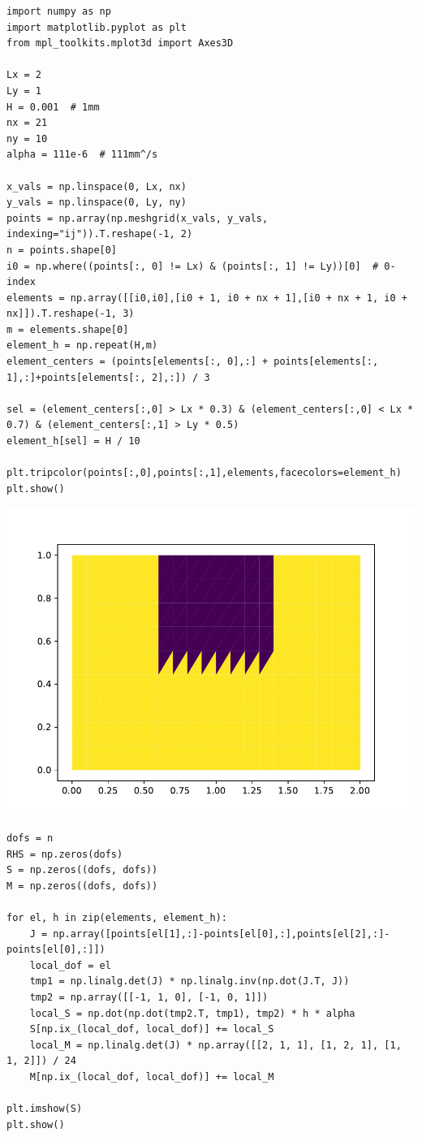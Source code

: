 \begin{verbatim}
import numpy as np
import matplotlib.pyplot as plt
from mpl_toolkits.mplot3d import Axes3D

Lx = 2
Ly = 1
H = 0.001  # 1mm
nx = 21
ny = 10
alpha = 111e-6  # 111mm^/s

x_vals = np.linspace(0, Lx, nx)
y_vals = np.linspace(0, Ly, ny)
points = np.array(np.meshgrid(x_vals, y_vals, indexing="ij")).T.reshape(-1, 2)
n = points.shape[0]
i0 = np.where((points[:, 0] != Lx) & (points[:, 1] != Ly))[0]  # 0-index
elements = np.array([[i0,i0],[i0 + 1, i0 + nx + 1],[i0 + nx + 1, i0 + nx]]).T.reshape(-1, 3)
m = elements.shape[0]
element_h = np.repeat(H,m)
element_centers = (points[elements[:, 0],:] + points[elements[:, 1],:]+points[elements[:, 2],:]) / 3

sel = (element_centers[:,0] > Lx * 0.3) & (element_centers[:,0] < Lx * 0.7) & (element_centers[:,1] > Ly * 0.5)
element_h[sel] = H / 10

plt.tripcolor(points[:,0],points[:,1],elements,facecolors=element_h)
plt.show()
\end{verbatim}

\includegraphics{heat_files/figure-latex/unnamed-chunk-1-1.pdf}

\begin{verbatim}
dofs = n
RHS = np.zeros(dofs)
S = np.zeros((dofs, dofs))
M = np.zeros((dofs, dofs))

for el, h in zip(elements, element_h):
    J = np.array([points[el[1],:]-points[el[0],:],points[el[2],:]-points[el[0],:]])
    local_dof = el
    tmp1 = np.linalg.det(J) * np.linalg.inv(np.dot(J.T, J))
    tmp2 = np.array([[-1, 1, 0], [-1, 0, 1]])
    local_S = np.dot(np.dot(tmp2.T, tmp1), tmp2) * h * alpha
    S[np.ix_(local_dof, local_dof)] += local_S
    local_M = np.linalg.det(J) * np.array([[2, 1, 1], [1, 2, 1], [1, 1, 2]]) / 24
    M[np.ix_(local_dof, local_dof)] += local_M

plt.imshow(S)
plt.show()
\end{verbatim}

